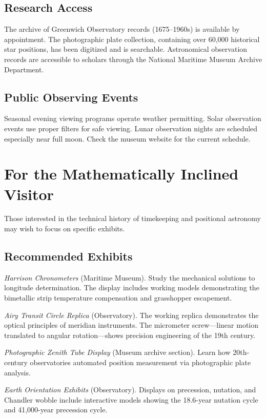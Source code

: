 \subsection*{Research Access}

The archive of Greenwich Observatory records (1675--1960s) is available by appointment. The photographic plate collection, containing over 60,000 historical star positions, has been digitized and is searchable. Astronomical observation records are accessible to scholars through the National Maritime Museum Archive Department.

\subsection*{Public Observing Events}

Seasonal evening viewing programs operate weather permitting. Solar observation events use proper filters for safe viewing. Lunar observation nights are scheduled especially near full moon. Check the museum website for the current schedule.

\section{For the Mathematically Inclined Visitor}

Those interested in the technical history of timekeeping and positional astronomy may wish to focus on specific exhibits.

\subsection*{Recommended Exhibits}

\textit{Harrison Chronometers} (Maritime Museum). Study the mechanical solutions to longitude determination. The display includes working models demonstrating the bimetallic strip temperature compensation and grasshopper escapement.

\textit{Airy Transit Circle Replica} (Observatory). The working replica demonstrates the optical principles of meridian instruments. The micrometer screw—linear motion translated to angular rotation—shows precision engineering of the 19th century.

\textit{Photographic Zenith Tube Display} (Museum archive section). Learn how 20th-century observatories automated position measurement via photographic plate analysis.

\textit{Earth Orientation Exhibits} (Observatory). Displays on precession, nutation, and Chandler wobble include interactive models showing the 18.6-year nutation cycle and 41,000-year precession cycle.

